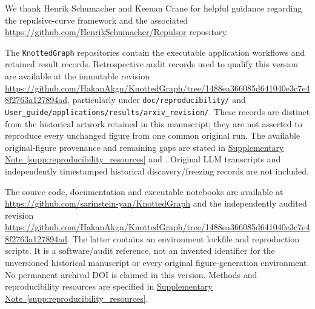 \documentclass[10pt,twocolumn]{article}
\providecommand{\SuppSubsecref}[1]{\hyperref[#1]{Supplementary Note~\ref*{#1}}}
\begin{document}
\label{sec:acknowledgements}
We thank Henrik Schumacher and Keenan Crane for helpful guidance regarding the repulsive-curve framework and the associated \url{https://github.com/HenrikSchumacher/Repulsor} repository. 

\label{sec:data_availability}
The \texttt{KnottedGraph} repositories contain the executable application workflows and retained result records. Retrospective audit records used to qualify this version are available at the immutable revision
\url{https://github.com/HakanAkgn/KnottedGraph/tree/1488ea366085d641040e3c7e48f2763a127894ad}, particularly under \texttt{doc/reproducibility/} and \texttt{User\_guide/applications/results/arxiv\_revision/}. These records are distinct from the historical artwork retained in this manuscript; they are not asserted to reproduce every unchanged figure from one common original run. The available original-figure provenance and remaining gaps are stated in \SuppSubsecref{supp:reproducibility_resources} and . Original LLM transcripts and independently timestamped historical discovery/freezing records are not included.

\label{sec:code_availability}
The source code, documentation and executable notebooks are available at \url{https://github.com/sarinstein-yan/KnottedGraph} and the independently audited revision \url{https://github.com/HakanAkgn/KnottedGraph/tree/1488ea366085d641040e3c7e48f2763a127894ad}. The latter contains an environment lockfile and reproduction scripts. It is a software/audit reference, not an invented identifier for the unversioned historical manuscript or every original figure-generation environment. No permanent archival DOI is claimed in this version. Methods and reproducibility resources are specified in \SuppSubsecref{supp:reproducibility_resources}.

\FloatBarrier


\end{document}
